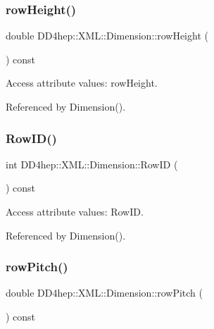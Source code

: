 \hypertarget{struct_d_d4hep_1_1_x_m_l_1_1_dimension_a58a91182ffd8afcd25ddf043d81ece32}{}\label{struct_d_d4hep_1_1_x_m_l_1_1_dimension_a58a91182ffd8afcd25ddf043d81ece32} 
\subsubsection{\texorpdfstring{row\+Height()}{rowHeight()}}
{\footnotesize\ttfamily double D\+D4hep\+::\+X\+M\+L\+::\+Dimension\+::row\+Height (\begin{DoxyParamCaption}{ }\end{DoxyParamCaption}) const}



Access attribute values\+: row\+Height. 



Referenced by Dimension().

\hypertarget{struct_d_d4hep_1_1_x_m_l_1_1_dimension_a680c172eb2e88e5cbd8db35fd3763f06}{}\label{struct_d_d4hep_1_1_x_m_l_1_1_dimension_a680c172eb2e88e5cbd8db35fd3763f06} 
\subsubsection{\texorpdfstring{Row\+I\+D()}{RowID()}}
{\footnotesize\ttfamily int D\+D4hep\+::\+X\+M\+L\+::\+Dimension\+::\+Row\+ID (\begin{DoxyParamCaption}{ }\end{DoxyParamCaption}) const}



Access attribute values\+: Row\+ID. 



Referenced by Dimension().

\hypertarget{struct_d_d4hep_1_1_x_m_l_1_1_dimension_a53810c784b62629f82e162238dc72ddd}{}\label{struct_d_d4hep_1_1_x_m_l_1_1_dimension_a53810c784b62629f82e162238dc72ddd} 
\subsubsection{\texorpdfstring{row\+Pitch()}{rowPitch()}}
{\footnotesize\ttfamily double D\+D4hep\+::\+X\+M\+L\+::\+Dimension\+::row\+Pitch (\begin{DoxyParamCaption}{ }\end{DoxyParamCaption}) const}



